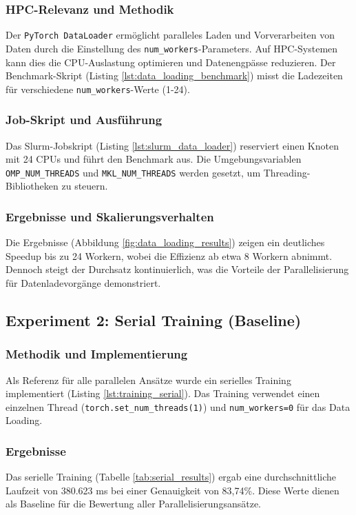 \documentclass{article}
\begin{document}
\subsubsection{HPC-Relevanz und Methodik}
Der \texttt{PyTorch DataLoader} ermöglicht paralleles Laden und Vorverarbeiten von Daten durch die Einstellung des 
\texttt{num\_workers}-Parameters. Auf HPC-Systemen kann dies die CPU-Auslastung optimieren und Datenengpässe reduzieren. 
Der Benchmark-Skript (Listing \ref{lst:data_loading_benchmark}) misst die Ladezeiten für verschiedene \texttt{num\_workers}-Werte (1-24).

\subsubsection{Job-Skript und Ausführung}
Das Slurm-Jobskript (Listing \ref{lst:slurm_data_loader}) reserviert einen Knoten mit 24 CPUs und führt den Benchmark aus. 
Die Umgebungsvariablen \texttt{OMP\_NUM\_THREADS} und \texttt{MKL\_NUM\_THREADS} werden gesetzt, um Threading-Bibliotheken zu steuern.

\subsubsection{Ergebnisse und Skalierungsverhalten}
Die Ergebnisse (Abbildung \ref{fig:data_loading_results}) zeigen ein deutliches Speedup bis zu 24 Workern, wobei die 
Effizienz ab etwa 8 Workern abnimmt. Dennoch steigt der Durchsatz kontinuierlich, was die Vorteile der Parallelisierung 
für Datenladevorgänge demonstriert.

\subsection{Experiment 2: Serial Training (Baseline)}
\subsubsection{Methodik und Implementierung}
Als Referenz für alle parallelen Ansätze wurde ein serielles Training implementiert (Listing \ref{lst:training_serial}). Das 
Training verwendet einen einzelnen Thread (\texttt{torch.set\_num\_threads(1)}) und \texttt{num\_workers=0} für das Data Loading.

\subsubsection{Ergebnisse}
Das serielle Training (Tabelle \ref{tab:serial_results}) ergab eine durchschnittliche Laufzeit von 380.623 ms bei einer Genauigkeit 
von 83,74\%. Diese Werte dienen als Baseline für die Bewertung aller Parallelisierungsansätze.
\end{document}
